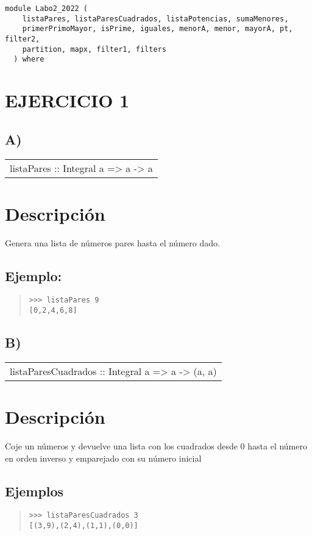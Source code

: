 \label{module:Labo2_2022}
\haddockbeginheader
{\haddockverb\begin{verbatim}
module Labo2_2022 (
    listaPares, listaParesCuadrados, listaPotencias, sumaMenores,
    primerPrimoMayor, isPrime, iguales, menorA, menor, mayorA, pt, filter2,
    partition, mapx, filter1, filters
  ) where\end{verbatim}}
\haddockendheader

\section{EJERCICIO 1}
\subsection{A)}
\begin{haddockdesc}
\item[\begin{tabular}{@{}l}
listaPares :: Integral a => a -> {\char 91}a{\char 93}
\end{tabular}]
{\haddockbegindoc
\section*{Descripción}
Genera una lista de números pares hasta el número dado.\par
\subsection*{Ejemplo:}
\begin{quote}
{\haddockverb\begin{verbatim}
>>> listaPares 9
[0,2,4,6,8]

\end{verbatim}}
\end{quote}}
\end{haddockdesc}
\subsection{B)}
\begin{haddockdesc}
\item[\begin{tabular}{@{}l}
listaParesCuadrados :: Integral a => a -> {\char 91}(a, a){\char 93}
\end{tabular}]
{\haddockbegindoc
\section*{Descripción}
Coje un números y devuelve una lista con los cuadrados desde 0 hasta el número en orden inverso y emparejado con su número inicial\par
\subsection*{Ejemplos}
\begin{quote}
{\haddockverb\begin{verbatim}
>>> listaParesCuadrados 3
[(3,9),(2,4),(1,1),(0,0)]

\end{verbatim}}
\end{quote}}
\end{haddockdesc}
